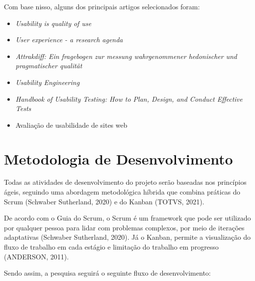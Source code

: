 Com base nisso, alguns dos principais artigos selecionados foram:

\begin{itemize}
	\item \textit{Usability is quality of use} \cite{bevan1995}
	\item \textit{User experience - a research agenda} \cite{hassenzahl2006}
	\item \textit{Attrakdiff: Ein fragebogen zur messung wahrgenommener hedonischer und pragmatischer qualität} \cite{hassenzahl2003}
	\item \textit{Usability Engineering} \cite{nielsen1994usability}
	\item \textit{Handbook of Usability Testing: How to Plan, Design, and Conduct Effective Tests} \cite{rubin2011}
	\item Avaliação de usabilidade de sites web \cite{winckler2022}
\end{itemize}

\section{Metodologia de Desenvolvimento}
\label{sec:Metodologia de Desenvolvimento}
Todas as atividades de desenvolvimento do projeto serão baseadas nos princípios ágeis, seguindo uma abordagem metodológica híbrida que combina práticas do Scrum (Schwaber Sutherland, 2020) e do Kanban (TOTVS, 2021). 

De acordo com o Guia do Scrum, o Scrum é um framework que pode ser utilizado por qualquer pessoa para lidar com problemas complexos, por meio de iterações adaptativas (Schwaber Sutherland, 2020). Já o Kanban, permite 
a visualização do fluxo de trabalho em cada estágio e limitação do trabalho em progresso (ANDERSON, 2011).

Sendo assim, a pesquisa seguirá o seguinte fluxo de desenvolvimento:

